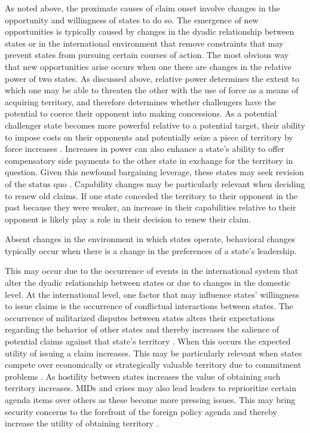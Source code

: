As noted above, the proximate causes of claim onset involve changes in the opportunity and willingness of states to do so. The emergence of new opportunities is typically caused by changes in the dyadic relationship between states or in the international environment that remove constraints that may prevent states from pursuing certain courses of action. The most obvious way that new opportunities arise occurs when one there are changes in the relative power of two states. As discussed above, relative power determines the extent to which one may be able to threaten the other with the use of force as a means of acquiring territory, and therefore determines whether challengers have the potential to coerce their opponent into making concessions. As a potential challenger state becomes more powerful relative to a potential target, their ability to impose costs on their opponents and potentially seize a piece of territory by force increases \citep[e.g.,][]{lemke2002, organski1981}. Increases in power can also enhance a state’s ability to offer compensatory side payments to the other state in exchange for the territory in question. Given this newfound bargaining leverage, these states may seek revision of the status quo \citep{fearon1995, powell2006}. Capability changes may be particularly relevant when deciding to renew old claims. If one state conceded the territory to their opponent in the past because they were weaker, an increase in their capabilities relative to their opponent is likely play a role in their decision to renew their claim.


Absent changes in the environment in which states operate, behavioral changes typically occur when there is a change in the preferences of a state’s leadership. 

This may occur due to the occurrence of events in the international system that alter the dyadic relationship between states or due to changes in the domestic level. At the international level, one factor that may influence states’ willingness to issue claims is the occurrence of conflictual interactions between states. The occurrence of militarized disputes between states alters their expectations regarding the behavior of other states and thereby increases the salience of potential claims against that state’s territory \citep{hensel2001, colaresi2007, vasquez2009}. When this occurs the expected utility of issuing a claim increases. This may be particularly relevant when states compete over economically or strategically valuable territory due to commitment problems \citep{fearon1995}. As hostility between states increases the value of obtaining such territory increases. MIDs and crises may also lead leaders to reprioritize certain agenda items over others as these become more pressing issues. This may bring security concerns to the forefront of the foreign policy agenda and thereby increase the utility of obtaining territory \citep{wood1998}. 

